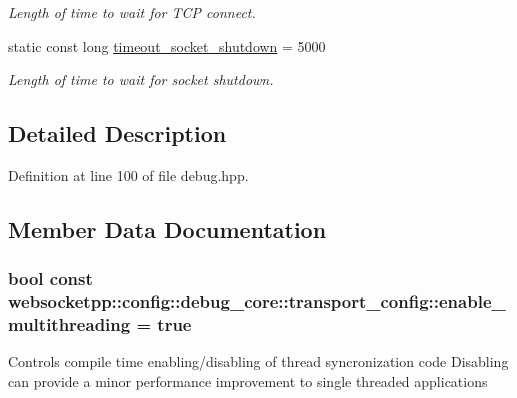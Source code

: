 \begin{DoxyCompactItemize}
\begin{DoxyCompactList}\small\item\em Length of time to wait for T\+CP connect. \end{DoxyCompactList}\item 
static const long \hyperlink{structwebsocketpp_1_1config_1_1debug__core_1_1transport__config_a8d8f7daa43c1fd23d227f3f20e71ceb5}{timeout\+\_\+socket\+\_\+shutdown} = 5000\hypertarget{structwebsocketpp_1_1config_1_1debug__core_1_1transport__config_a8d8f7daa43c1fd23d227f3f20e71ceb5}{}\label{structwebsocketpp_1_1config_1_1debug__core_1_1transport__config_a8d8f7daa43c1fd23d227f3f20e71ceb5}

\begin{DoxyCompactList}\small\item\em Length of time to wait for socket shutdown. \end{DoxyCompactList}\end{DoxyCompactItemize}


\subsection{Detailed Description}


Definition at line 100 of file debug.\+hpp.



\subsection{Member Data Documentation}
\subsubsection[{\texorpdfstring{enable\+\_\+multithreading}{enable\_multithreading}}]{\setlength{\rightskip}{0pt plus 5cm}bool const websocketpp\+::config\+::debug\+\_\+core\+::transport\+\_\+config\+::enable\+\_\+multithreading = true\hspace{0.3cm}{\ttfamily [static]}}\hypertarget{structwebsocketpp_1_1config_1_1debug__core_1_1transport__config_a082f02f956f0e82ff8646967a7c79e4a}{}\label{structwebsocketpp_1_1config_1_1debug__core_1_1transport__config_a082f02f956f0e82ff8646967a7c79e4a}
Controls compile time enabling/disabling of thread syncronization code Disabling can provide a minor performance improvement to single threaded applications 

